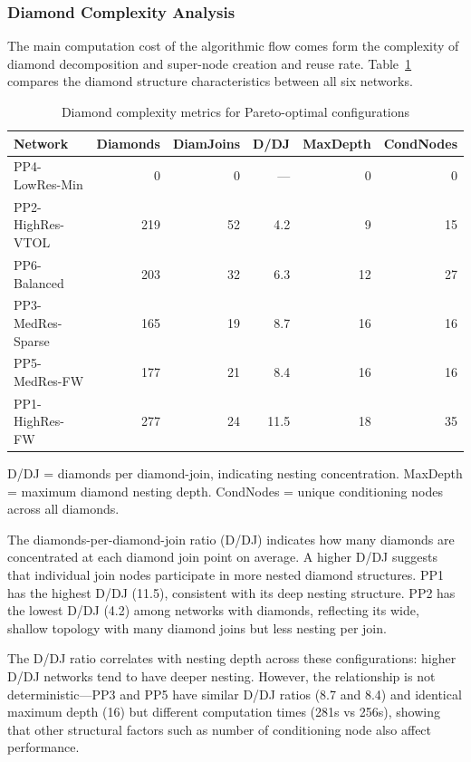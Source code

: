 \subsubsection{Diamond Complexity Analysis}
The main computation cost of the algorithmic flow comes form the complexity of diamond decomposition and super-node creation and reuse rate.  
Table~\ref{tab:diamond_complexity} compares the diamond structure characteristics between all six networks. 

\begin{table}[ht]
\caption{Diamond complexity metrics for Pareto-optimal configurations}
\label{tab:diamond_complexity}
\centering
\begin{tabular}{lrrrrr}
\toprule
\textbf{Network} & \textbf{Diamonds} & \textbf{DiamJoins} & \textbf{D/DJ} & \textbf{MaxDepth} & \textbf{CondNodes} \\
\midrule
PP4-LowRes-Min    &   0 &  0 &  ---  &  0 &  0 \\
PP2-HighRes-VTOL  & 219 & 52 &  4.2  &  9 & 15 \\
PP6-Balanced      & 203 & 32 &  6.3  & 12 & 27 \\
PP3-MedRes-Sparse & 165 & 19 &  8.7  & 16 & 16 \\
PP5-MedRes-FW     & 177 & 21 &  8.4  & 16 & 16 \\
PP1-HighRes-FW    & 277 & 24 & 11.5  & 18 & 35 \\
\bottomrule
\end{tabular}
\begin{minipage}{\textwidth}
\footnotesize
D/DJ = diamonds per diamond-join, indicating nesting concentration. MaxDepth = maximum diamond nesting depth. CondNodes = unique conditioning nodes across all diamonds.
\end{minipage}
\end{table}

The diamonds-per-diamond-join ratio (D/DJ) indicates how many diamonds are concentrated at each diamond join point on average. A higher D/DJ suggests that individual join nodes participate in more nested diamond structures. PP1 has the highest D/DJ (11.5), consistent with its deep nesting structure. PP2 has the lowest D/DJ (4.2) among networks with diamonds, reflecting its wide, shallow topology with many diamond joins but less nesting per join.

The D/DJ ratio correlates with nesting depth across these configurations: higher D/DJ networks tend to have deeper nesting. However, the relationship is not deterministic---PP3 and PP5 have similar D/DJ ratios (8.7 and 8.4) and identical maximum depth (16) but different computation times (281s vs 256s), showing that other structural factors such as number of conditioning node  also affect performance.

